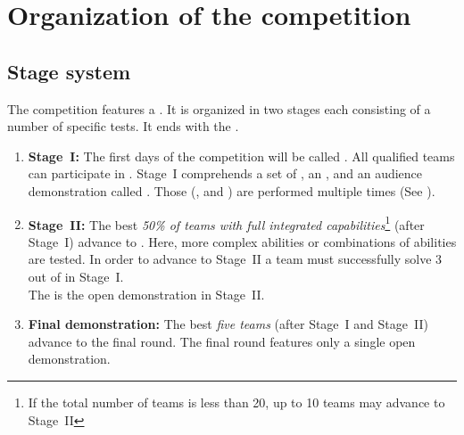 \section{Organization of the competition}
\label{sec:procedure_during_competition}

\subsection{Stage system}\label{rule:stages}

The competition features a . It is organized in two stages each consisting of a number of specific tests. It ends with the .

\begin{enumerate}
	\item \textbf{Stage~I:} The first days of the competition will be called . 
	All qualified teams can participate in . Stage~I comprehends a set of , an , and an audience demonstration called . 
	Those  (, and ) are performed multiple times (See ). 

	\item \textbf{Stage~II:} The best \emph{50\% of teams with full integrated capabilities}\footnote{If the total number of teams is less than 20, up to 10 teams may advance to Stage~II} (after Stage~I) advance to . Here, more complex abilities or combinations of abilities are tested. In order to advance to Stage~II a team must successfully solve 3 out of  in Stage~I. \\
	The  is the open demonstration in Stage~II.
	\item \textbf{Final demonstration:} The best \emph{five teams} (after Stage~I and Stage~II) advance to the final round. The final round features only a single open demonstration.
\end{enumerate}

